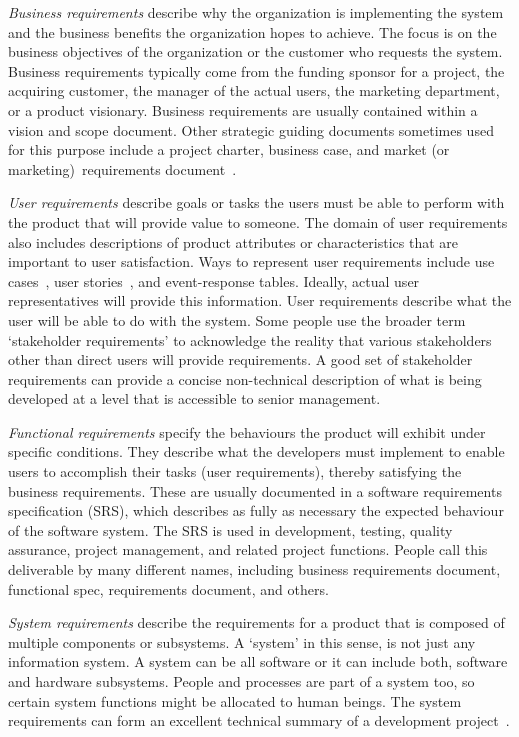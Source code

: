 \documentclass[dissertation,final]{softeng}
\begin{document}
\emph{Business requirements} describe why the organization is implementing the system and the business benefits the organization hopes to achieve. The focus is on the business objectives of the organization or the customer who requests the system. Business requirements typically come from the funding sponsor for a project, the acquiring customer, the manager of the actual users, the marketing department, or a product visionary. Business requirements are usually contained within a vision and scope document. Other strategic guiding documents sometimes used for this purpose include a project charter, business case, and market (or marketing)~\mbox{requirements} document~\citep{Wiegers2013}.

\emph{User requirements} describe goals or tasks the users must be able to perform with the product that will provide value to someone. The domain of user requirements also includes descriptions of product attributes or characteristics that are important to user satisfaction. Ways to represent user requirements include use cases~\citep{cockburn2000writing}, user stories~\citep{cohn2004user}, and event-response tables. Ideally, actual user representatives will provide this information. User requirements describe what the user will be able to do with the system. Some people use the broader term `stakeholder requirements' to acknowledge the reality that various stakeholders other than direct users will provide requirements. A good set of stakeholder requirements can provide a concise non-technical description of what is being developed at a level that is accessible to senior management.

\emph{Functional requirements} specify the behaviours the product will exhibit under specific conditions. They describe what the developers must implement to enable users to accomplish their tasks (user requirements), thereby satisfying the business requirements. These are usually documented in a software requirements specification (SRS), which describes as fully as necessary the expected behaviour of the software system. The SRS is used in development, testing, quality assurance, project management, and related project functions. People call this deliverable by many different names, including business requirements document, functional spec, requirements document, and others.

\emph{System requirements} describe the requirements for a product that is composed of multiple components or subsystems. A `system' in this sense, is not just any information system. A system can be all software or it can include both, software and hardware subsystems. People and processes are part of a system too, so certain system functions might be allocated to human beings. The system requirements can form an excellent technical summary of a development project~\citep{Hull2011}.
\end{document}
